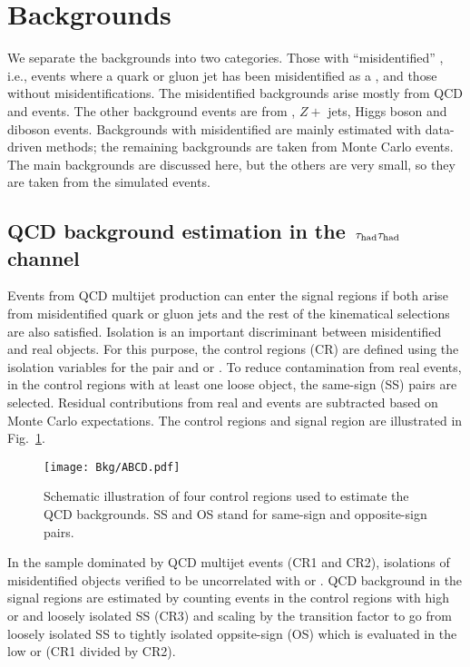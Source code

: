 \section{Backgrounds}
\label{sect:bkg}
We separate the backgrounds into two categories.  Those with 
``misidentified'' \Tau, i.e., events where a quark or gluon jet has been misidentified
as a \Tau, and those without \Tau misidentifications.  
The misidentified \Tau backgrounds arise mostly from QCD and \wjets events.  The 
other background events are from \ttbar, $Z+$ jets, Higgs boson and diboson events.
Backgrounds with misidentified \Tau are mainly estimated with data-driven methods; the 
remaining backgrounds are taken from Monte Carlo events. The main backgrounds
are discussed here, but the others are very small, so they are  taken from the simulated events.

\subsection{\texorpdfstring{QCD background estimation in the $\,\tau_{\rm had}\tau_{\rm had}$ channel}{QCD background estimation in the tau-tau channel}}
\label{sect:bkgQCD}
Events from QCD multijet production can enter the signal regions 
if both \Tau arise from misidentified quark or gluon jets
and the rest of the kinematical selections are also satisfied.  
Isolation is an important 
discriminant between misidentified and real \Tau objects. For this purpose, the control regions (CR) are defined using the isolation variables 
for the \Tau pair and \mttwo or \SumMT. To reduce contamination from real \tauTau events, 
in the control regions with at least one loose \Tau object, 
the same-sign (SS) pairs are selected. Residual contributions from real 
\tauTau and \wjets events are subtracted based on Monte Carlo expectations. The control regions and signal region are 
illustrated in Fig.~\ref{fig:ABCDQCD}. 
\begin{figure}[!Hhtb]
\centering
\texttt{[image: Bkg/ABCD.pdf]}
\caption{Schematic illustration of four control regions used to estimate the QCD backgrounds. SS and OS stand for same-sign and opposite-sign pairs.}
\label{fig:ABCDQCD}
\end{figure}
In the sample dominated by QCD multijet events (CR1 and CR2), isolations of misidentified \Tau objects verified 
to be uncorrelated with \mttwo or \SumMT.
QCD background in the signal regions are estimated by counting events in the control regions with high \mttwo or \SumMT  
and loosely isolated SS \tauTau (CR3)
and scaling by the transition factor to go from loosely isolated SS to tightly isolated oppsite-sign (OS) 
\tauTau which is evaluated in the low \mttwo or \SumMT (CR1 divided by CR2).

